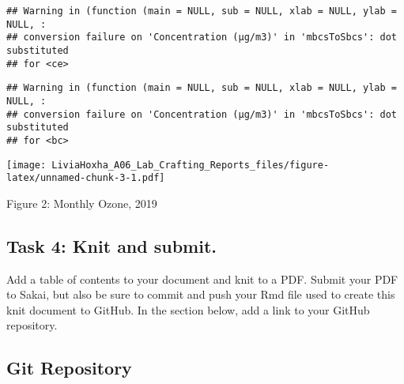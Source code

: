 \documentclass[
]{article}
\begin{document}
\begin{verbatim}
## Warning in (function (main = NULL, sub = NULL, xlab = NULL, ylab = NULL, :
## conversion failure on 'Concentration (μg/m3)' in 'mbcsToSbcs': dot substituted
## for <ce>
\end{verbatim}

\begin{verbatim}
## Warning in (function (main = NULL, sub = NULL, xlab = NULL, ylab = NULL, :
## conversion failure on 'Concentration (μg/m3)' in 'mbcsToSbcs': dot substituted
## for <bc>
\end{verbatim}

\texttt{[image: LiviaHoxha\_A06\_Lab\_Crafting\_Reports\_files/figure-latex/unnamed-chunk-3-1.pdf]}

Figure 2: Monthly Ozone, 2019 \newpage

\hypertarget{task-4-knit-and-submit.}{%
\subsection{Task 4: Knit and submit.}\label{task-4-knit-and-submit.}}

Add a table of contents to your document and knit to a PDF. Submit your
PDF to Sakai, but also be sure to commit and push your Rmd file used to
create this knit document to GitHub. In the section below, add a link to
your GitHub repository.

\hypertarget{git-repository}{%
\subsection{Git Repository}\label{git-repository}}
\end{document}
